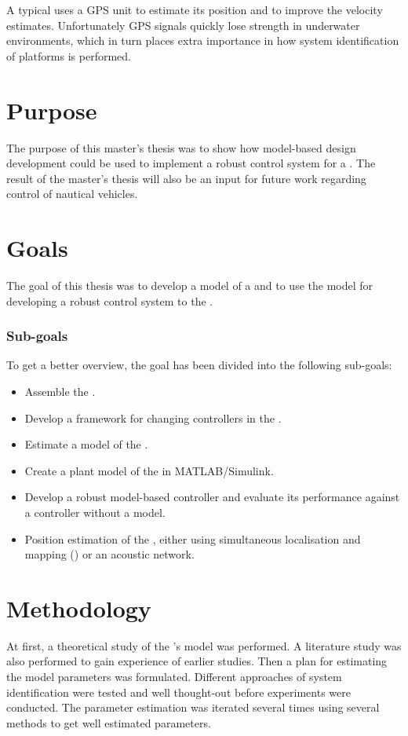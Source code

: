 A typical \abbrUV uses a GPS unit to estimate its position and to improve the velocity estimates. Unfortunately GPS signals quickly lose strength in underwater environments, which in turn places extra importance in how system identification of \abbrROV platforms is performed.


\section{Purpose}
The purpose of this master's thesis was to show how model-based design development could be used to implement a robust control system for a \abbrROV. The result of the master's thesis will also be an input for future work regarding control of nautical vehicles. 


\section{Goals}
The goal of this thesis was to develop a model of a \abbrROV and to use the model for developing a robust control system to the \abbrROV.

\subsubsection{Sub-goals}
To get a better overview, the goal has been divided into the following sub-goals:
\begin{itemize}
    \item Assemble the \abbrROV.
    \item Develop a framework for changing controllers in the \abbrROV.
    \item Estimate a model of the \abbrROV.
    \item Create a plant model of the \abbrROV in MATLAB/Simulink.
    \item Develop a robust model-based controller and evaluate its performance against a controller without a model.
    \item Position estimation of the \abbrROV, either using simultaneous localisation and mapping (\abbrSLAM) or an acoustic network.
\end{itemize}

\section{Methodology}
At first, a theoretical study of the \abbrROV's model was performed. A literature study was also performed to gain experience of earlier studies. Then a plan for estimating the model parameters was formulated. Different approaches of system identification were tested and well thought-out before experiments were conducted. The parameter estimation was iterated several times using several methods to get well estimated parameters. 

